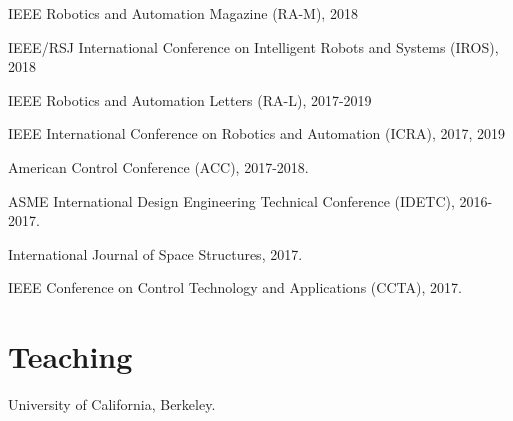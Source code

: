 \documentclass[letterpaper]{deedy-resume} %
\begin{document}
{\begin{tightitemize}
\item IEEE Robotics and Automation Magazine (RA-M), 2018

\item IEEE/RSJ International Conference on Intelligent Robots and Systems (IROS), 2018

\item IEEE Robotics and Automation Letters (RA-L), 2017-2019
  
\item IEEE International Conference on Robotics and Automation (ICRA), 2017, 2019

\item American Control Conference (ACC), 2017-2018.

\item ASME International Design Engineering Technical Conference (IDETC), 2016-2017.

\item International Journal of Space Structures, 2017.

\item IEEE Conference on Control Technology and Applications (CCTA), 2017.

\end{tightitemize}


\section{Teaching}

\vspace{0.2cm}

\begin{etaremune}

\item {} University of California, Berkeley.

\end{etaremune}


  


}
\end{document}
